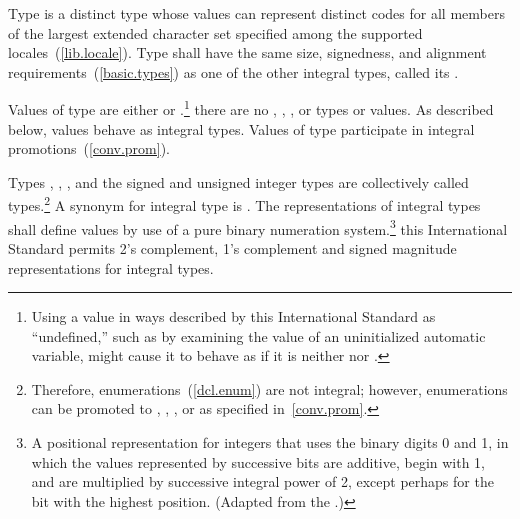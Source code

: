 \pnum
{}%
%
%
Type  is a distinct type whose values can represent
distinct codes for all members of the largest extended character set
specified among the supported locales~(\ref{lib.locale}). Type
 shall have the same size, signedness, and alignment
requirements~(\ref{basic.types}) as one of the other integral types,
called its .

\pnum
{}%
Values of type  are either  or
.\footnote{Using a  value in ways described by this International
Standard as ``undefined,'' such as by examining the value of an
uninitialized automatic variable, might cause it to behave as if it is
neither  nor .}
\enternote there are no , , ,
or  types or values. \exitnote As described below,
 values behave as integral types. Values of type
 participate in integral promotions~(\ref{conv.prom}).

\pnum
Types , ,
, and the signed and unsigned integer types are
collectively called
%
 types.\footnote{Therefore, enumerations~(\ref{dcl.enum})
are not integral; however, enumerations can be promoted to
, , , or 
as specified in~\ref{conv.prom}.}
A synonym for integral type is
%
. The representations of integral types shall
define values by use of  a pure binary numeration system.\footnote{A positional
representation for integers that uses the binary digits 0
and 1, in which the values represented by successive bits are additive,
begin with 1, and are multiplied by successive integral power of 2,
except perhaps for the bit with the highest position. (Adapted from the
.)}
\enterexample this International Standard permits 2's complement, 1's
complement and signed magnitude representations for integral types.
\exitexample

